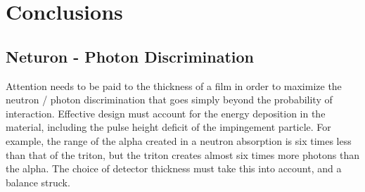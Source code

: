 \chapter{Conclusions}
\label{chap:Conclusions}

\section{Neturon - Photon Discrimination}
Attention needs to be paid to the thickness of a film in order to maximize the neutron / photon discrimination that goes simply beyond the probability of interaction.
Effective design must account for the energy deposition in the material, including the pulse height deficit of the impingement particle.
For example, the range of the alpha created in a  neutron absorption is six times less than that of the triton, but the triton creates almost six times more photons than the alpha.
The choice of detector thickness must take this into account, and a balance struck.
